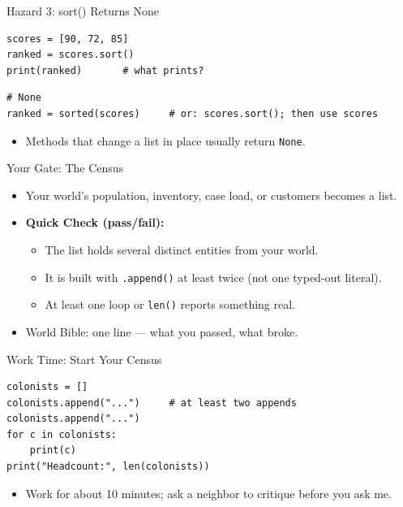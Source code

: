 \documentclass{beamer}
\begin{document}
\begin{frame}[fragile]{Hazard 3: sort() Returns None}
\begin{verbatim}
scores = [90, 72, 85]
ranked = scores.sort()
print(ranked)       # what prints?
\end{verbatim}
\pause
\begin{verbatim}
# None
ranked = sorted(scores)     # or: scores.sort(); then use scores
\end{verbatim}
\begin{itemize}
    \item Methods that change a list in place usually return \texttt{None}.
\end{itemize}
\end{frame}

\begin{frame}{Your Gate: The Census}
\begin{itemize}
    \item Your world's population, inventory, case load, or customers becomes a list.
    \item \textbf{Quick Check (pass/fail):}
    \begin{itemize}
        \item The list holds several distinct entities from your world.
        \item It is built with \texttt{.append()} at least twice (not one typed-out literal).
        \item At least one loop or \texttt{len()} reports something real.
    \end{itemize}
    \item World Bible: one line --- what you passed, what broke.
\end{itemize}
\end{frame}

\begin{frame}[fragile]{Work Time: Start Your Census}
\begin{verbatim}
colonists = []
colonists.append("...")     # at least two appends
colonists.append("...")
for c in colonists:
    print(c)
print("Headcount:", len(colonists))
\end{verbatim}
\begin{itemize}
    \item Work for about 10 minutes; ask a neighbor to critique before you ask me.
\end{itemize}
\end{frame}
\end{document}
